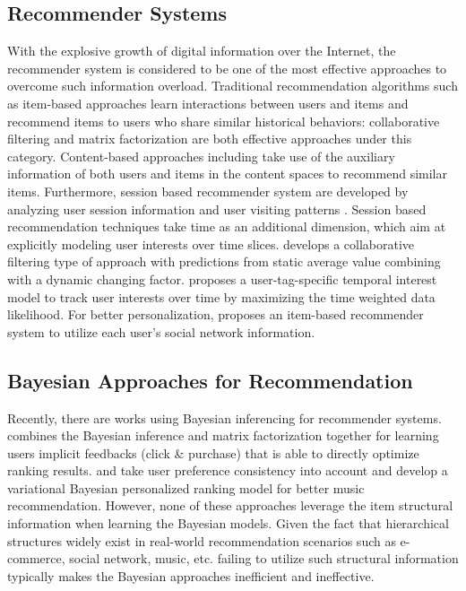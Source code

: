 \subsection{Recommender Systems}

With the explosive growth of digital information over the Internet, the recommender system is considered to be one of the most effective approaches to overcome such information overload. Traditional recommendation algorithms such as item-based approaches learn interactions between users and items and recommend items to users who share similar historical behaviors: collaborative filtering \cite{Sarwar:2001:ICF:371920.372071,Su:2009:SCF:1592474.1722966} and matrix factorization \cite{Rendle:2010:FPM} are both effective approaches under this category.  Content-based approaches including \cite{2011rsh..book...73L,Liu:2011,Yuan:2015} take use of the auxiliary information of both users and items in the content spaces to recommend similar items.  Furthermore, session based recommender system are developed by analyzing user session information and user visiting patterns \cite{Gultekin_acollaborative,Tang_review:2013}. Session based recommendation techniques take time as an additional dimension, which aim at explicitly modeling user interests over time slices. \cite{Koren:2010} develops a collaborative filtering type of approach with predictions from static average value combining with a dynamic changing factor. \cite{Yin:2011} proposes a user-tag-specific temporal interest model to track user interests over time by maximizing the time weighted data likelihood.  For better personalization, \cite{Guy:2009} proposes an item-based recommender system to utilize each user's social network information. 

\subsection{Bayesian Approaches for Recommendation}

Recently, there are works using Bayesian inferencing for recommender systems. \cite{rendle2009bpr} combines the Bayesian inference and matrix factorization together for learning users implicit feedbacks (click \& purchase) that is able to directly optimize ranking results. \cite{Ben-Elazar:2017} and \cite{zhang2007efficient} take user preference consistency into account and develop a variational Bayesian personalized ranking model for better music recommendation.  However, none of these approaches leverage the item structural information when learning the Bayesian models.  Given the fact that hierarchical structures widely exist in real-world recommendation scenarios such as e-commerce, social network, music, etc. failing to utilize such structural information typically makes the Bayesian approaches inefficient and ineffective.  

